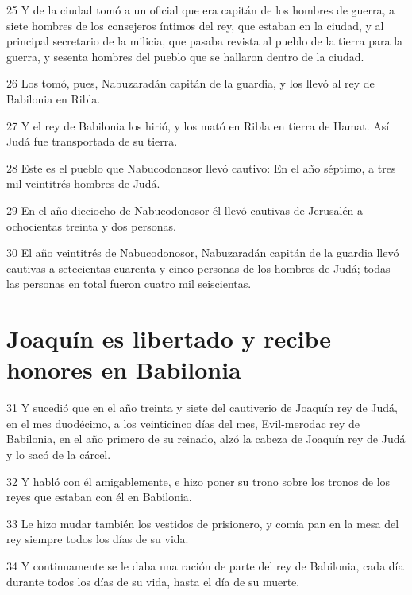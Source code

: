 \par 25 Y de la ciudad tomó a un oficial que era capitán de los hombres de guerra, a siete hombres de los consejeros íntimos del rey, que estaban en la ciudad, y al principal secretario de la milicia, que pasaba revista al pueblo de la tierra para la guerra, y sesenta hombres del pueblo que se hallaron dentro de la ciudad.
\par 26 Los tomó, pues, Nabuzaradán capitán de la guardia, y los llevó al rey de Babilonia en Ribla.
\par 27 Y el rey de Babilonia los hirió, y los mató en Ribla en tierra de Hamat. Así Judá fue transportada de su tierra.
\par 28 Este es el pueblo que Nabucodonosor llevó cautivo: En el año séptimo, a tres mil veintitrés hombres de Judá.
\par 29 En el año dieciocho de Nabucodonosor él llevó cautivas de Jerusalén a ochocientas treinta y dos personas.
\par 30 El año veintitrés de Nabucodonosor, Nabuzaradán capitán de la guardia llevó cautivas a setecientas cuarenta y cinco personas de los hombres de Judá; todas las personas en total fueron cuatro mil seiscientas.

\section*{Joaquín es libertado y recibe honores en Babilonia}

\par 31 Y sucedió que en el año treinta y siete del cautiverio de Joaquín rey de Judá, en el mes duodécimo, a los veinticinco días del mes, Evil-merodac rey de Babilonia, en el año primero de su reinado, alzó la cabeza de Joaquín rey de Judá y lo sacó de la cárcel.
\par 32 Y habló con él amigablemente, e hizo poner su trono sobre los tronos de los reyes que estaban con él en Babilonia.
\par 33 Le hizo mudar también los vestidos de prisionero, y comía pan en la mesa del rey siempre todos los días de su vida.
\par 34 Y continuamente se le daba una ración de parte del rey de Babilonia, cada día durante todos los días de su vida, hasta el día de su muerte.

